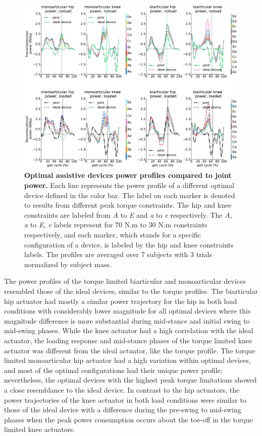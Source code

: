\documentclass[10pt,letterpaper]{article}
\begin{document}
\begin{figure}[ht]   
	\centering
	\includegraphics[width=\linewidth]{Pareto_Simulations_Figures/PaperFigure_Paretofront_PowerProfiles.pdf}
	\vspace{1mm}
		\caption{{\small\textbf{Optimal assistive devices power profiles compared to joint power.} Each line represents the power profile of a different optimal device defined in the color bar. The label on each marker is denoted to results from different peak torque constraints. The hip and knee constraints are labeled from {\it A} to {\it E} and {\it a} to {\it e} respectively. The {\it A, a} to {\it E, e} labels represent for 70 N.m to 30 N.m constraints respectively, and each marker, which stands for a specific configuration of a device, is labeled by the hip and knee constraints labels. The profiles are averaged over 7 subjects with 3 trials normalized by subject mass.}}
	\label{Fig_Paretofronts_Power_Profiles}
\end{figure}
\vspace{2mm}
The power profiles of the torque limited biarticular and monoarticular devices resembled those of the ideal devices, similar to the torque profiles. The biarticular hip actuator had mostly a similar power trajectory for the hip in both load conditions with considerably lower magnitude for all optimal devices where this magnitude difference is more substantial during mid-stance and initial swing to mid-swing phases. While the knee actuator had a high correlation with the ideal actuator, the loading response and mid-stance phases of the torque limited knee actuator was different from the ideal actuator, like the torque profile. The torque limited monoarticular hip actuator had a high variation within optimal devices, and most of the optimal configurations had their unique power profile; nevertheless, the optimal devices with the highest peak torque limitations showed a close resemblance to the ideal device. In contrast to the hip actuators, the power trajectories of the knee actuator in both load conditions were similar to those of the ideal device with a difference during the pre-swing to mid-swing phases when the peak power consumption occurs about the toe-off in the torque limited knee actuators.\\
\end{document}
